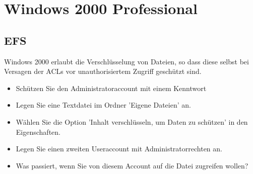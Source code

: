 
\section{Windows 2000 Professional}


	\subsection{EFS}

	Windows 2000 erlaubt die Verschlüsselung von Dateien, so dass diese selbst bei Versagen der ACLs vor unauthorisiertem Zugriff geschützt sind.

	\begin{itemize}
		\item Schützen Sie den Administratoraccount mit einem Kenntwort 
		\item Legen Sie eine Textdatei im Ordner 'Eigene Dateien' an.
		\item Wählen Sie die Option 'Inhalt verschlüsseln, um Daten zu schützen' in den Eigenschaften.
		\item Legen Sie einen zweiten Useraccount mit Administratorrechten an.
		\item Was passiert, wenn Sie von diesem Account auf die Datei zugreifen wollen?
	\end{itemize}

